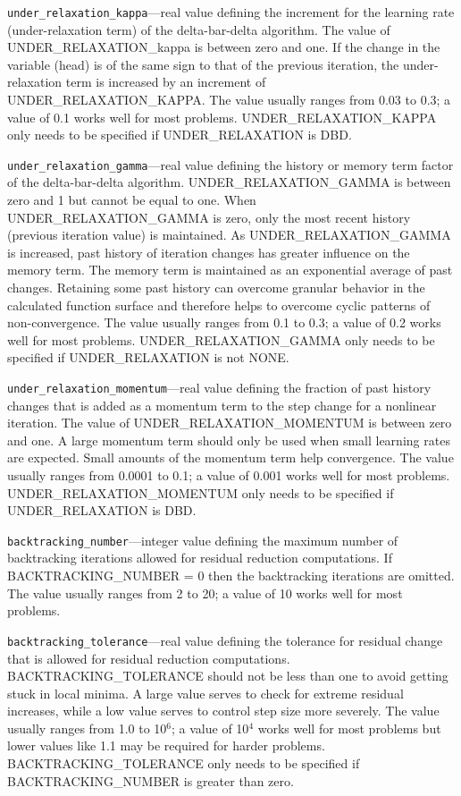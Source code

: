 \begin{description}
\item \texttt{under\_relaxation\_kappa}---real value defining the increment for the learning rate (under-relaxation term) of the delta-bar-delta algorithm. The value of UNDER\_RELAXATION\_kappa is between zero and one. If the change in the variable (head) is of the same sign to that of the previous iteration, the under-relaxation term is increased by an increment of UNDER\_RELAXATION\_KAPPA. The value usually ranges from 0.03 to 0.3; a value of 0.1 works well for most problems. UNDER\_RELAXATION\_KAPPA only needs to be specified if UNDER\_RELAXATION is DBD.

\item \texttt{under\_relaxation\_gamma}---real value defining the history or memory term factor of the delta-bar-delta algorithm. UNDER\_RELAXATION\_GAMMA is between zero and 1 but cannot be equal to one. When UNDER\_RELAXATION\_GAMMA is zero, only the most recent history (previous iteration value) is maintained. As UNDER\_RELAXATION\_GAMMA is increased, past history of iteration changes has greater influence on the memory term. The memory term is maintained as an exponential average of past changes. Retaining some past history can overcome granular behavior in the calculated function surface and therefore helps to overcome cyclic patterns of non-convergence. The value usually ranges from 0.1 to 0.3; a value of 0.2 works well for most problems. UNDER\_RELAXATION\_GAMMA only needs to be specified if UNDER\_RELAXATION is not NONE.

\item \texttt{under\_relaxation\_momentum}---real value defining the fraction of past history changes that is added as a momentum term to the step change for a nonlinear iteration. The value of UNDER\_RELAXATION\_MOMENTUM is between zero and one. A large momentum term should only be used when small learning rates are expected. Small amounts of the momentum term help convergence. The value usually ranges from 0.0001 to 0.1; a value of 0.001 works well for most problems. UNDER\_RELAXATION\_MOMENTUM only needs to be specified if UNDER\_RELAXATION is DBD.

\item \texttt{backtracking\_number}---integer value defining the maximum number of backtracking iterations allowed for residual reduction computations. If BACKTRACKING\_NUMBER = 0 then the backtracking iterations are omitted. The value usually ranges from 2 to 20; a value of 10 works well for most problems.

\item \texttt{backtracking\_tolerance}---real value defining the tolerance for residual change that is allowed for residual reduction computations. BACKTRACKING\_TOLERANCE should not be less than one to avoid getting stuck in local minima. A large value serves to check for extreme residual increases, while a low value serves to control step size more severely. The value usually ranges from 1.0 to 10$^6$; a value of 10$^4$ works well for most problems but lower values like 1.1 may be required for harder problems. BACKTRACKING\_TOLERANCE only needs to be specified if BACKTRACKING\_NUMBER is greater than zero.


\end{description}
